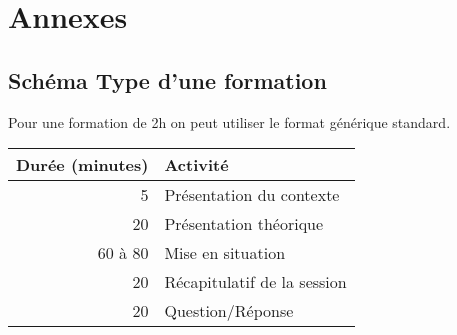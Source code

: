 \section{Annexes}

\subsection{Schéma Type d'une formation}

Pour une formation de 2h on peut utiliser le format générique standard. \\

\begin{tabular}{|r|l|}
\hline
Durée (minutes)& Activité\\
\hline
5& Présentation du contexte\\
\hline
20& Présentation théorique\\
\hline
60 à 80& Mise en situation\\
\hline
20& Récapitulatif de la session\\
\hline
20& Question/Réponse\\
\hline
\end{tabular}

